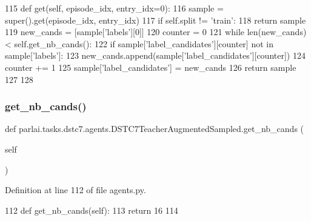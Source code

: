 \begin{DoxyCode}
115     \textcolor{keyword}{def }get(self, episode\_idx, entry\_idx=0):
116         sample = super().get(episode\_idx, entry\_idx)
117         \textcolor{keywordflow}{if} self.split != \textcolor{stringliteral}{'train'}:
118             \textcolor{keywordflow}{return} sample
119         new\_cands = [sample[\textcolor{stringliteral}{'labels'}][0]]
120         counter = 0
121         \textcolor{keywordflow}{while} len(new\_cands) < self.get\_nb\_cands():
122             \textcolor{keywordflow}{if} sample[\textcolor{stringliteral}{'label\_candidates'}][counter] \textcolor{keywordflow}{not} \textcolor{keywordflow}{in} sample[\textcolor{stringliteral}{'labels'}]:
123                 new\_cands.append(sample[\textcolor{stringliteral}{'label\_candidates'}][counter])
124             counter += 1
125         sample[\textcolor{stringliteral}{'label\_candidates'}] = new\_cands
126         \textcolor{keywordflow}{return} sample
127 
128 
\end{DoxyCode}
\mbox{\label{classparlai_1_1tasks_1_1dstc7_1_1agents_1_1DSTC7TeacherAugmentedSampled_a8be3cd7226a4c0c61fe422cb47d26ccc}} 
\subsubsection{\texorpdfstring{get\+\_\+nb\+\_\+cands()}{get\_nb\_cands()}}
{\footnotesize\ttfamily def parlai.\+tasks.\+dstc7.\+agents.\+D\+S\+T\+C7\+Teacher\+Augmented\+Sampled.\+get\+\_\+nb\+\_\+cands (\begin{DoxyParamCaption}\item[{}]{self }\end{DoxyParamCaption})}



Definition at line 112 of file agents.\+py.


\begin{DoxyCode}
112     \textcolor{keyword}{def }get\_nb\_cands(self):
113         \textcolor{keywordflow}{return} 16
114 
\end{DoxyCode}
\mbox{\label{classparlai_1_1tasks_1_1dstc7_1_1agents_1_1DSTC7TeacherAugmentedSampled_ab52133c4ddb36400b28221e359f504e3}} 
